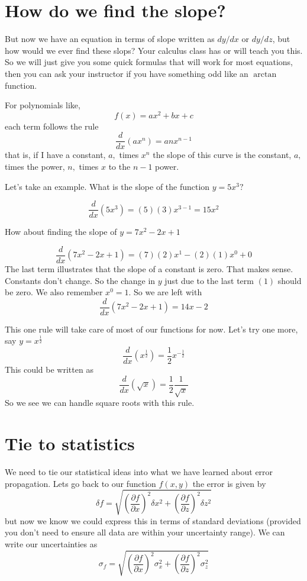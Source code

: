 \documentclass{book}
\begin{document}
\section{How do we find the slope?}

But now we have an equation in terms of slope written as $dy/dx$ or $dy/dz$,
but how would we ever find these slops? Your calculus class has or will teach
you this. So we will just give you some quick formulas that will work for most
equations, then you can ask your instructor if you have something odd like an
$\arctan$ function.

For polynomials like,
\[
f\left(  x\right)  =ax^{2}+bx+c
\]
each term follows the rule
\[
\frac{d}{dx}\left(  ax^{n}\right)  =anx^{n-1}
\]
that is, if I have a constant, $a,$ times $x^{n}$ the slope of this curve is
the constant, $a,$ times the power, $n,$ times $x$ to the $n-1$ power.

Let's take an example. What is the slope of the function $y=5x^{3}?$

\[
\frac{d}{dx}\left(  5x^{3}\right)  =\left(  5\right)  \left(  3\right)
x^{3-1}=15x^{2}
\]


How about finding the slope of $y=7x^{2}-2x+1$

\[
\frac{d}{dx}\left(  7x^{2}-2x+1\right)  =\left(  7\right)  \left(  2\right)
x^{1}-\left(  2\right)  (1)x^{0}+0
\]
The last term illustrates that the slope of a constant is zero. That makes
sense. Constants don't change. So the change in $y$ just due to the last term
$(1)$ should be zero. We also remember $x^{0}=1.$ So we are left with
\[
\frac{d}{dx}\left(  7x^{2}-2x+1\right)  =14x-2
\]


This one rule will take care of most of our functions for now. Let's try one
more, say $y=x^{\frac{1}{2}}$
\[
\frac{d}{dx}\left(  x^{\frac{1}{2}}\right)  =\frac{1}{2}x^{-\frac{1}{2}}
\]
This could be written as
\[
\frac{d}{dx}\left(  \sqrt{x}\right)  =\frac{1}{2}\frac{1}{\sqrt{x}}
\]
So we see we can handle square roots with this rule.

\section{Tie to statistics}

We need to tie our statistical ideas into what we have learned about error
propagation. Lets go back to our function $f\left(  x,y\right)  $ the error is
given by
\[
\delta f=\sqrt{\left(  \frac{\partial f}{\partial x}\right)  ^{2}\delta
x^{2}+\left(  \frac{\partial f}{\partial z}\right)  ^{2}\delta z^{2}}
\]
but now we know we could express this in terms of standard deviations
(provided you don't need to ensure all data are within your uncertainty
range). We can write our uncertainties as
\[
\sigma_{f}=\sqrt{\left(  \frac{\partial f}{\partial x}\right)  ^{2}\sigma
_{x}^{2}+\left(  \frac{\partial f}{\partial z}\right)  ^{2}\sigma_{z}^{2}}
\]
\end{document}
